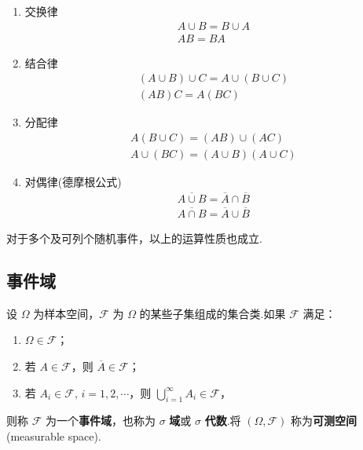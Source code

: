 \begin{property}
    \begin{enumerate}
        \item 交换律
        $$
        \begin{gathered}
            A \cup B = B \cup A \\
            AB=BA
        \end{gathered}
        $$
        \item 结合律
        $$
        \begin{gathered}
            (A \cup B) \cup C = A \cup (B \cup C) \\
            (AB)C=A(BC)
        \end{gathered}
        $$
        \item 分配律
        $$
        \begin{gathered}
            A(B \cup C) = (AB) \cup (AC) \\
            A \cup (BC) = (A \cup B)(A \cup C)
        \end{gathered}
        $$
        \item 对偶律(德摩根公式)
        $$
        \begin{gathered}
            \overline{A \cup B} = \overline{A} \cap \overline{B} \\
            \overline{A \cap B} = \overline{A} \cup \overline{B}
        \end{gathered}
        $$
    \end{enumerate}
\end{property}

对于多个及可列个随机事件，以上的运算性质也成立.

\subsection{事件域}

\begin{definition}
    \indent 设 $\varOmega$ 为样本空间，$\mathcal{F}$ 为 $\varOmega$ 的某些子集组成的集合类.如果 $\mathcal{F}$ 满足：
    \begin{enumerate}
        \item $\varOmega \in \mathcal{F}$；
        \item 若 $A \in \mathcal{F}$，则 $\overline{A} \in \mathcal{F}$；
        \item 若 $A_i \in \mathcal{F}, \, i=1,2,\cdots$，则 $\displaystyle\bigcup_{i=1}^\infty A_i \in \mathcal{F}$，
    \end{enumerate}
    则称 $\mathcal{F}$ 为一个\textbf{事件域}，也称为 $\sigma$ \textbf{域}或 $\sigma$ \textbf{代数}.将 $(\varOmega, \mathcal{F})$ 称为\textbf{可测空间}(measurable space).
\end{definition}

